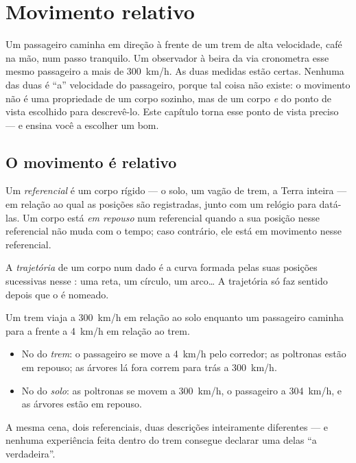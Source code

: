 \chapter{Movimento relativo}\label{ch:g10:relative-motion}

Um passageiro caminha em direção à frente de um trem de alta velocidade,
café na mão, num passo tranquilo. Um observador à beira da via cronometra
esse mesmo passageiro a mais de \qty{300}{km/h}. As duas medidas estão
certas. Nenhuma das duas é ``a'' velocidade do passageiro, porque tal
coisa não existe: o movimento não é uma propriedade de um corpo sozinho,
mas de um corpo \emph{e} do ponto de vista escolhido para descrevê-lo.
Este capítulo torna esse ponto de vista preciso --- e ensina você a
escolher um bom.

\section{O movimento é relativo}

\begin{definition}[Referencial]\label{def:g10:relative-motion:frame}
Um \emph{referencial} é um corpo rígido --- o solo, um
vagão de trem, a Terra inteira --- em relação ao qual as posições são
registradas, junto com um relógio para datá-las. Um corpo está \emph{em
repouso} num referencial quando a sua posição nesse
referencial não muda com o tempo; caso contrário, ele está em movimento
nesse referencial.
\end{definition}

\begin{definition}[Trajetória]\label{def:g10:relative-motion:trajectory}
A \emph{trajetória} de um corpo num dado  é
a curva formada pelas suas posições sucessivas nesse : uma
reta, um círculo, um arco\dots{} A trajetória só faz sentido depois que o
 é nomeado.
\end{definition}

\begin{example}\label{ex:g10:relative-motion:walker}
Um trem viaja a \qty{300}{km/h} em relação ao solo enquanto um passageiro
caminha para a frente a \qty{4}{km/h} em relação ao trem.
\begin{itemize}
  \item No  do \emph{trem}: o passageiro se move a
        \qty{4}{km/h} pelo corredor; as poltronas estão em repouso; as
        árvores lá fora correm para trás a \qty{300}{km/h}.
  \item No  do \emph{solo}: as poltronas se movem a
        \qty{300}{km/h}, o passageiro a \qty{304}{km/h}, e as árvores
        estão em repouso.
\end{itemize}
A mesma cena, dois referenciais, duas descrições inteiramente diferentes
--- e nenhuma experiência feita dentro do trem consegue declarar uma
delas ``a verdadeira''.
\end{example}

